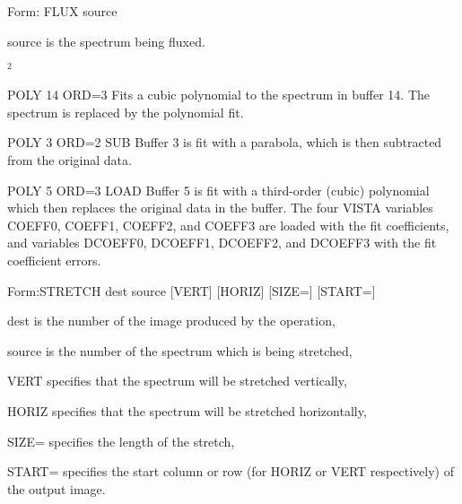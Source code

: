 {\newpage\clearpage
{}%
\begin{command}
  \item[Form: FLUX source\hfill]{}
  \item[source]{is the spectrum being fluxed.}
\end{command}%
\lthtmlfigureZ
\lthtmlcheckvsize\clearpage}

{\newpage\clearpage
{}%
$^2$%
\lthtmlinlinemathZ
\lthtmlcheckvsize\clearpage}

{\newpage\clearpage
{}%
\begin{example}
  \item[POLY 14 ORD=3]{Fits a cubic polynomial to the spectrum in buffer
       14.  The spectrum is replaced by the polynomial fit.}
\par\item[POLY 3 ORD=2 SUB]{Buffer 3 is fit with a parabola, which is then
       subtracted from the original data.}
\par\item[POLY 5 ORD=3 LOAD]{Buffer 5 is fit with a third-order (cubic)
       polynomial which then replaces the original data in the buffer.  The
       four VISTA variables COEFF0, COEFF1, COEFF2, and COEFF3 are loaded
       with the fit coefficients, and variables DCOEFF0, DCOEFF1, DCOEFF2,
       and DCOEFF3 with the fit coefficient errors.}
\end{example}%
\lthtmlfigureZ
\lthtmlcheckvsize\clearpage}

{\newpage\clearpage
{}%
\begin{command}
  \item[Form:STRETCH dest source {[VERT]} {[HORIZ]} {[SIZE=]} 
       {[START=]}\hfill]{}
  \item[dest]{is the number of the image produced by the operation,}
  \item[source]{is the number of the spectrum which is being stretched,}
  \item[VERT]{specifies that the spectrum will be stretched vertically,}
  \item[HORIZ]{specifies that the spectrum will be stretched horizontally,}
  \item[SIZE=]{specifies the length of the stretch,}
  \item[START=]{specifies the start column or row (for HORIZ or
       VERT respectively) of the output image.}
\end{command}%
\lthtmlfigureZ
\lthtmlcheckvsize\clearpage}

